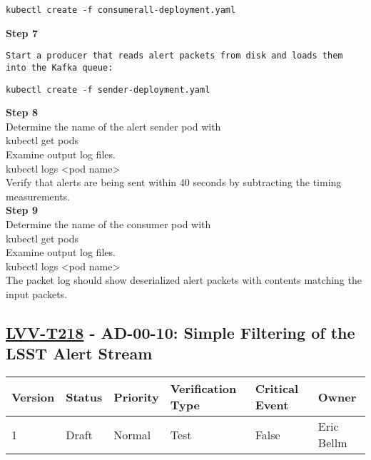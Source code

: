 \begin{verbatim}
kubectl create -f consumerall-deployment.yaml
\end{verbatim}

\textbf{Step 7}\\

\begin{verbatim}
Start a producer that reads alert packets from disk and loads them into the Kafka queue:
\end{verbatim}

\begin{verbatim}
kubectl create -f sender-deployment.yaml
\end{verbatim}

\textbf{Step 8}\\
Determine the name of the alert sender pod with\\[2\baselineskip]kubectl
get pods\\[2\baselineskip]Examine output log
files.\\[2\baselineskip]kubectl logs \textless{}pod
name\textgreater{}\\[2\baselineskip]Verify that alerts are being sent
within 40 seconds by subtracting the timing
measurements.\\[2\baselineskip]\textbf{Step 9}\\
Determine the name of the consumer pod with\\[2\baselineskip]kubectl get
pods\\[2\baselineskip]Examine output log files.\\[2\baselineskip]kubectl
logs \textless{}pod name\textgreater{}\\[2\baselineskip]The packet log
should show deserialized alert packets with contents matching the input
packets.\\[4\baselineskip]

\hypertarget{lvv-t218---ad-00-10-simple-filtering-of-the-lsst-alert-stream}{\subsection{\texorpdfstring{\href{https://jira.lsstcorp.org/secure/Tests.jspa\#/testCase/LVV-T218}{LVV-T218}
- AD-00-10: Simple Filtering of the LSST Alert
Stream}{LVV-T218 - AD-00-10: Simple Filtering of the LSST Alert Stream}}\label{lvv-t218---ad-00-10-simple-filtering-of-the-lsst-alert-stream}}

\begin{longtable}[]{@{}llllll@{}}
\toprule
Version & Status & Priority & Verification Type & Critical Event &
Owner\tabularnewline
\midrule
\endhead
1 & Draft & Normal & Test & False & Eric Bellm\tabularnewline
\bottomrule
\end{longtable}

